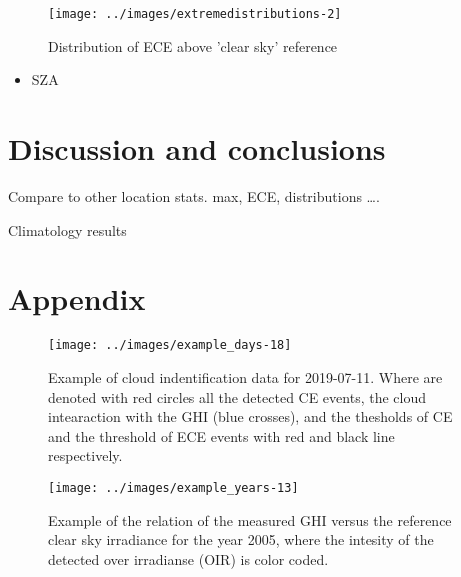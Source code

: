 \documentclass[preprint, 3p,
authoryear]{elsarticle} %
\providecommand{\tightlist}{%
  \setlength{\itemsep}{0pt}\setlength{\parskip}{0pt}}
\begin{document}
\begin{figure}

{\centering \texttt{[image: ../images/extremedistributions-2]} 

}

\caption{Distribution of ECE above 'clear sky' reference}\label{fig:unnamed-chunk-4}
\end{figure}

\begin{itemize}
\tightlist
\item
  SZA
\end{itemize}

\hypertarget{discussion-and-conclusions}{%
\section{Discussion and conclusions}\label{discussion-and-conclusions}}

Compare to other location stats. max, ECE, distributions \ldots.

Climatology results

\hypertarget{appendix}{%
\section*{Appendix}\label{appendix}}

\begin{figure}

{\centering \texttt{[image: ../images/example\_days-18]} 

}

\caption{Example of cloud indentification data for 2019-07-11. Where are denoted with red circles all the detected CE events, the cloud intearaction with the GHI (blue crosses), and the thesholds of CE and the threshold of ECE events with red and black line respectively.}\label{fig:example-day}
\end{figure}

\begin{figure}

{\centering \texttt{[image: ../images/example\_years-13]} 

}

\caption{Example of the relation of the measured GHI versus the reference clear sky irradiance for the year 2005, where the intesity of the detected over irradianse (OIR) is color coded.}\label{fig:example-year}
\end{figure}


\end{document}
